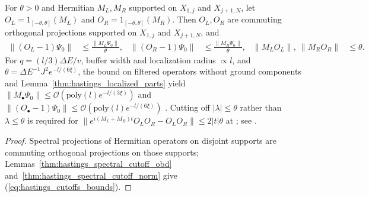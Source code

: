 \begin{lemma}
    \label{thm:hastings_cutoffs}
    For $\theta>0$ and Hermitian $M_L,M_R$ supported on $X_{1,j}$ and
    $X_{j+1,N}$, let $O_L=1_{[-\theta,\theta]}(M_L)$ and
    $O_R=1_{[-\theta,\theta]}(M_R)$. Then $O_L,O_R$ are commuting orthogonal
    projections supported on $X_{1,j}$ and $X_{j+1,N}$, and
    \begin{align}
        \|(O_L-1)\Psi_0\|       & \le\frac{\|M_L\Psi_0\|}{\theta}, &
        \|(O_R-1)\Psi_0\|       & \le\frac{\|M_R\Psi_0\|}{\theta}, &
        \|M_LO_L\|,\ \|M_RO_R\| & \le\theta.
        \label{eq:hastings_cutoffs_bounds}
    \end{align}
    For $q=(l/3)\Delta E/v$, buffer width and localization radius $\propto l$,
    and $\theta=\Delta E^{-1}J^2e^{-l/(6\xi)}$,
    the bound on filtered operators without ground components
    \cite[``Filtered operators without ground components'']{QICLean2026Blueprint}
    and Lemma~\ref{thm:hastings_localized_parts} yield
    $\|M_\bullet\Psi_0\|\le\mathcal O(\mathrm{poly}(l)e^{-l/(3\xi)})$ and
    $\|(O_\bullet-1)\Psi_0\|\le\mathcal O(\mathrm{poly}(l)e^{-l/(6\xi)})$
    \cite[lines 829--841]{Hastings2007AreaLaw}. Cutting off $|\lambda|\le\theta$
    rather than $\lambda\le\theta$ is required for
    $\|e^{i(M_L+M_R)t}O_LO_R-O_LO_R\|\le2|t|\theta$ at
    \cite[lines 879--880]{Hastings2007AreaLaw}; see
    \cite{gap:hastings07_spectral_cutoff_threshold}.
\end{lemma}
\begin{proof}
    Spectral projections of Hermitian operators on disjoint supports are
    commuting orthogonal projections on those supports;
    Lemmas~\ref{thm:hastings_spectral_cutoff_obd}
    and~\ref{thm:hastings_spectral_cutoff_norm} give
    (\ref{eq:hastings_cutoffs_bounds}).
\end{proof}

